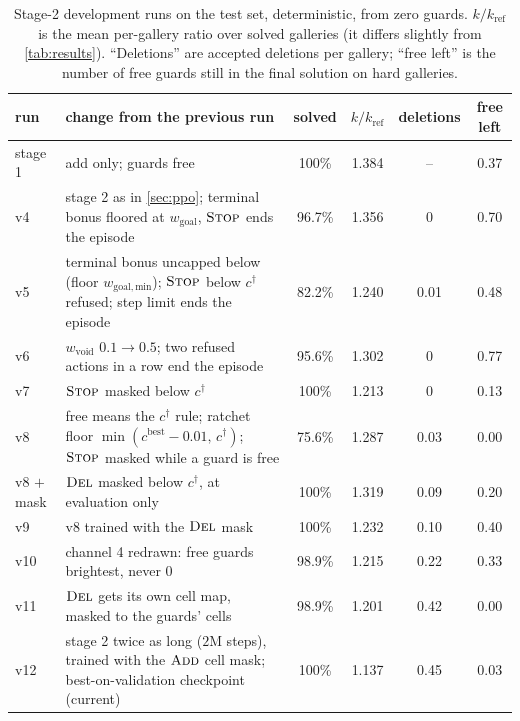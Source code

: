 \documentclass[11pt,a4paper]{article}
\begin{document}
\begin{table}[!htbp]
\centering\small
\caption{Stage-2 development runs on the test set, deterministic, from zero guards.
$k/k_{\mathrm{ref}}$ is the mean per-gallery ratio over solved galleries (it differs slightly
from \cref{tab:results}). ``Deletions'' are accepted deletions per gallery; ``free left'' is the
number of free guards still in the final solution on hard galleries.}
\label{tab:runs}
\begin{tabularx}{\linewidth}{lXcccc}
\toprule
run & change from the previous run & solved & $k/k_{\mathrm{ref}}$ & deletions & free left \\
\midrule
stage 1 & add only; guards free & 100\% & 1.384 & -- & 0.37 \\
v4 & stage 2 as in \cref{sec:ppo}; terminal bonus floored at $w_{\mathrm{goal}}$, $\textsc{Stop}$ ends the episode & 96.7\% & 1.356 & 0 & 0.70 \\
v5 & terminal bonus uncapped below (floor $w_{\mathrm{goal,min}}$); $\textsc{Stop}$ below $c^\dagger$ refused; step limit ends the episode & 82.2\% & 1.240 & 0.01 & 0.48 \\
v6 & $w_{\mathrm{void}}$ $0.1\to0.5$; two refused actions in a row end the episode & 95.6\% & 1.302 & 0 & 0.77 \\
v7 & $\textsc{Stop}$ masked below $c^\dagger$ & 100\% & 1.213 & 0 & 0.13 \\
v8 & free means the $c^\dagger$ rule; ratchet floor $\min(c^{\mathrm{best}}-0.01,\,c^\dagger)$; $\textsc{Stop}$ masked while a guard is free & 75.6\% & 1.287 & 0.03 & 0.00 \\
v8 $+$ mask & $\textsc{Del}$ masked below $c^\dagger$, at evaluation only & 100\% & 1.319 & 0.09 & 0.20 \\
v9 & v8 trained with the $\textsc{Del}$ mask & 100\% & 1.232 & 0.10 & 0.40 \\
v10 & channel 4 redrawn: free guards brightest, never $0$ & 98.9\% & 1.215 & 0.22 & 0.33 \\
v11 & $\textsc{Del}$ gets its own cell map, masked to the guards' cells & 98.9\% & 1.201 & 0.42 & 0.00 \\
v12 & stage 2 twice as long ($2$M steps), trained with the $\textsc{Add}$ cell mask; best-on-validation checkpoint (current) & 100\% & 1.137 & 0.45 & 0.03 \\
\bottomrule
\end{tabularx}
\end{table}
\end{document}
